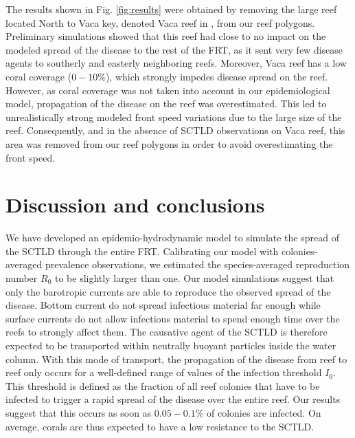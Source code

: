 \documentclass[utf8]{frontiersSCNS}
\begin{document}
The results shown in Fig. \ref{fig:results} were obtained by removing the large reef located North to Vaca key, denoted Vaca reef in \cite{frys20}, from our reef polygons. Preliminary simulations showed that this reef had close to no impact on the modeled spread of the disease to the rest of the FRT, as it sent very few disease agents to southerly and easterly neighboring reefs. Moreover, Vaca reef has a low coral coverage ($0-10\%$), which strongly impedes disease spread on the reef. However, as coral coverage was not taken into account in our epidemiological model, propagation of the disease on the reef was overestimated. This led to unrealistically strong modeled front speed variations due to the large size of the reef. Consequently, and in the absence of SCTLD observations on Vaca reef, this area was removed from our reef polygons in order to avoid overestimating the front speed.



\section{Discussion and conclusions}


We have developed an epidemio-hydrodynamic model to simulate the spread of the SCTLD through the entire FRT. Calibrating our model with colonies-averaged prevalence observations, we estimated the species-averaged reproduction number $R_0$ to be slightly larger than one. Our model simulations suggest that only the barotropic currents are able to reproduce the observed spread of the disease. Bottom current do not spread infectious material far enough while surface currents do not allow infectious material to spend enough time over the reefs to strongly affect them. The causative agent of the SCTLD is therefore expected to be transported within neutrally buoyant particles inside the water column. With this mode of transport, the propagation of the disease from reef to reef only occurs for a well-defined range of values of the infection threshold $I_0$. This threshold is defined as the fraction of all reef colonies that have to be infected to trigger a rapid spread of the disease over the entire reef. Our results suggest that this occurs as soon as $0.05-0.1\%$ of colonies are infected. On average, corals are thus expected to have a low resistance to the SCTLD.
\end{document}
